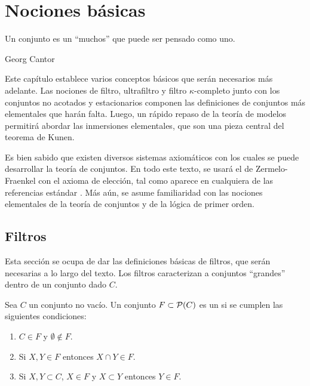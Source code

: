 \fi
\ifbasicos
\chapter{Nociones básicas}
\thispagestyle{empty}

\epigraph
{
    Un conjunto es un “muchos” que puede ser pensado como uno.
}
{Georg Cantor \autocite[3]{ivorra_teoria_2022}}

Este capítulo establece varios conceptos básicos que serán necesarios
más adelante. Las nociones de filtro, ultrafiltro y filtro $\kappa$-completo
junto con los conjuntos no acotados y estacionarios componen las definiciones de
conjuntos más elementales que harán falta.
Luego, un rápido repaso de la teoría de modelos permitirá abordar las inmersiones
elementales, que son una pieza central del teorema de Kunen.

Es bien sabido que existen diversos sistemas axiomáticos
con los cuales se puede desarrollar la teoría de conjuntos.
En todo este texto, se usará el de Zermelo-Fraenkel con el axioma de elección, tal como
aparece en cualquiera de las referencias estándar \autocite{kunen_set_2013,jech_set_2003}.
Más aún, se asume familiaridad con las nociones elementales de la teoría de conjuntos
y de la lógica de primer orden.

\section{Filtros}

Esta sección se ocupa de dar las definiciones básicas de filtros,
que serán necesarias a lo largo del texto.
Los filtros caracterizan a conjuntos ``grandes'' dentro
de un conjunto dado $C$.

\begin{defi}
    Sea $C$ un conjunto no vacío. Un conjunto $F\subset \pwset{C}$ es un
     si se cumplen las siguientes condiciones:
    \begin{enumerate}[label=(\roman*)]
        \item $C\in F$ y $\emptyset\notin F$.
        \item Si $X,Y\in F$ entonces $X\cap Y\in F$.
        \item Si $X,Y\subset C$, $X\in F$ y $X\subset Y$ entonces $Y\in F$.
    \end{enumerate}
\end{defi}

